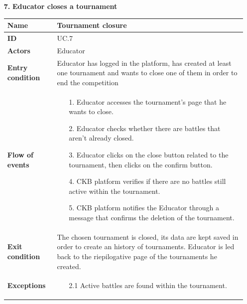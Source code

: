 \documentclass{article}
\begin{document}
{\begin{enumerate}
    \item[\textbf{7.}] \textbf{Educator closes a tournament}
          \begin{xltabular}{\textwidth}
              {| >{\raggedright\arraybackslash}g | >{\raggedright\arraybackslash}X |}
              \hline
              \endfirsthead
              \hline
              \endhead
              \endfoot
              \hline
              \endlastfoot




              \textbf{Name} & Tournament closure\\
              \hline
              \textbf{ID} & UC.7\\
              \hline
              \textbf{Actors} & Educator\\
              \hline
              \textbf{Entry condition} & Educator has logged in the platform, has created at least one tournament
              and wants to close one of them in order to end the competition \\
              \hline
              \textbf{Flow of events} &    \begin{enumerate}
                  \item[1.] Educator accesses the tournament's page
                        that he wants to close.
                  \item[2.] Educator checks whether there are battles that
                        aren't already closed.
                  \item[3.] Educator clicks on the close button related to
                        the tournament, then clicks on the confirm button.
                  \item[4.] CKB platform verifies if there are no battles
                        still active within the tournament.
                  \item[5.] CKB platform notifies the Educator through
                        a message that confirms the deletion of the tournament.
              \end{enumerate} \\
              \hline
              \textbf{Exit condition} & The chosen tournament is closed, its data are kept saved in
              order to create an history of tournaments. Educator is led back to the riepilogative
              page of the tournaments he created. \\
              \hline
              \textbf{Exceptions} &    \begin{itemize}
                  \item[2.1] Active battles are found within the tournament.

\end{itemize}
\end{xltabular}
\end{enumerate}}
\end{document}
